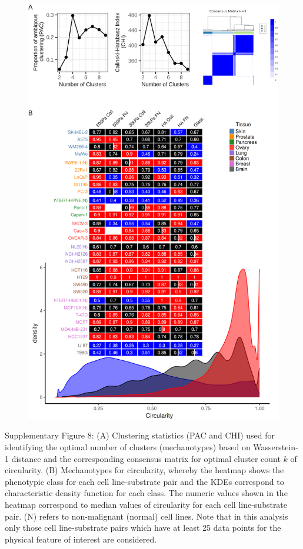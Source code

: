 \documentclass[11pt,letterpaper,english,oneside]{article} %
\begin{document}
\begin{figure}[H]
    \hspace*{-1cm}
    \centering
    \includegraphics[scale=0.282]{../Figures/Supplementary_Figure8/supplementary_figure8.png} 
    \caption{}
    \label{fig:fig8}
\end{figure}
\begin{adjustwidth}{1cm}{1cm}
Supplementary Figure 8: (A) Clustering statistics (PAC and CHI) used for identifying the optimal number of clusters (mechanotypes) based on Wasserstein-1 distance and the corresponding consensus matrix for optimal cluster count $k$
of circularity. (B) Mechanotypes for circularity, whereby the heatmap shows the phenotypic class for each cell line-substrate pair and the KDEs correspond to characteristic density function for each class. 
The numeric values shown in the heatmap correspond to median values of circularity for each cell line-substrate pair. (N) refers to non-malignant (normal) cell lines. 
Note that in this analysis only those cell line-substrate pairs which have at least 25 data points for the physical feature of interest are considered.
\end{adjustwidth}
\end{document}
